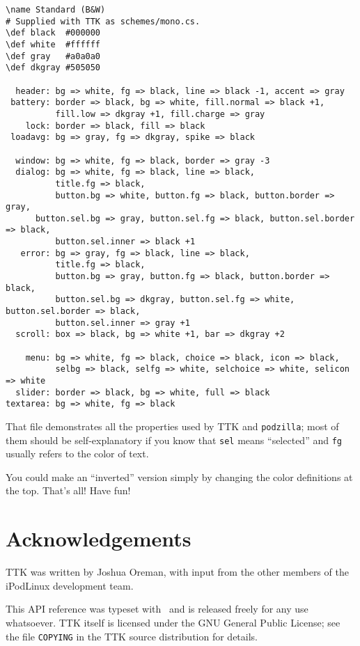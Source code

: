 \documentclass[12pt,letterpaper]{report}
\def\pz{\texttt{podzilla}}
\let\ttt\tt
\def\tt{\def\_{{\ttt\char`\_}}\ttt}
\def\texttt#1{{\tt #1}}
\begin{document}
{\footnotesize\begin{verbatim}
\name Standard (B&W)
# Supplied with TTK as schemes/mono.cs.
\def black  #000000
\def white  #ffffff
\def gray   #a0a0a0
\def dkgray #505050

  header: bg => white, fg => black, line => black -1, accent => gray
 battery: border => black, bg => white, fill.normal => black +1,
          fill.low => dkgray +1, fill.charge => gray
    lock: border => black, fill => black
 loadavg: bg => gray, fg => dkgray, spike => black

  window: bg => white, fg => black, border => gray -3
  dialog: bg => white, fg => black, line => black,
          title.fg => black,	
          button.bg => white, button.fg => black, button.border => gray,
	  button.sel.bg => gray, button.sel.fg => black, button.sel.border => black,
          button.sel.inner => black +1
   error: bg => gray, fg => black, line => black,
          title.fg => black,
          button.bg => gray, button.fg => black, button.border => black,
          button.sel.bg => dkgray, button.sel.fg => white, button.sel.border => black,
          button.sel.inner => gray +1
  scroll: box => black, bg => white +1, bar => dkgray +2

    menu: bg => white, fg => black, choice => black, icon => black,
          selbg => black, selfg => white, selchoice => white, selicon => white
  slider: border => black, bg => white, full => black
textarea: bg => white, fg => black
\end{verbatim}
}
That file demonstrates all the properties used by TTK and \pz; most of them should be self-explanatory
if you know that \verb|sel| means ``selected'' and \verb|fg| usually refers to the color of text.

You could make an ``inverted'' version simply by changing the color definitions at the top.
\vskip1cm
{\centering\LARGE\sc That's all! Have fun!}

\chapter{Acknowledgements}
TTK was written by Joshua Oreman, with input from the other members of the iPodLinux development
team.

This API reference was typeset with \LaTeXe\ and is released freely for any use whatsoever. TTK itself
is licensed under the GNU General Public License; see the file \verb|COPYING| in the TTK source
distribution for details.
\end{document}
